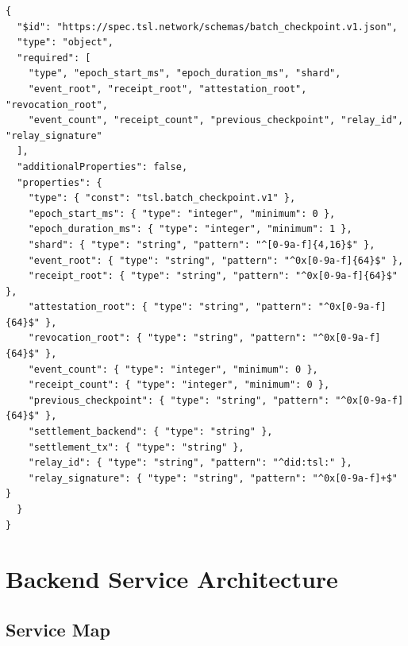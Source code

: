 \documentclass[11pt]{article}
\begin{document}
\begin{lstlisting}[style=tslcode]
{
  "$id": "https://spec.tsl.network/schemas/batch_checkpoint.v1.json",
  "type": "object",
  "required": [
    "type", "epoch_start_ms", "epoch_duration_ms", "shard",
    "event_root", "receipt_root", "attestation_root", "revocation_root",
    "event_count", "receipt_count", "previous_checkpoint", "relay_id", "relay_signature"
  ],
  "additionalProperties": false,
  "properties": {
    "type": { "const": "tsl.batch_checkpoint.v1" },
    "epoch_start_ms": { "type": "integer", "minimum": 0 },
    "epoch_duration_ms": { "type": "integer", "minimum": 1 },
    "shard": { "type": "string", "pattern": "^[0-9a-f]{4,16}$" },
    "event_root": { "type": "string", "pattern": "^0x[0-9a-f]{64}$" },
    "receipt_root": { "type": "string", "pattern": "^0x[0-9a-f]{64}$" },
    "attestation_root": { "type": "string", "pattern": "^0x[0-9a-f]{64}$" },
    "revocation_root": { "type": "string", "pattern": "^0x[0-9a-f]{64}$" },
    "event_count": { "type": "integer", "minimum": 0 },
    "receipt_count": { "type": "integer", "minimum": 0 },
    "previous_checkpoint": { "type": "string", "pattern": "^0x[0-9a-f]{64}$" },
    "settlement_backend": { "type": "string" },
    "settlement_tx": { "type": "string" },
    "relay_id": { "type": "string", "pattern": "^did:tsl:" },
    "relay_signature": { "type": "string", "pattern": "^0x[0-9a-f]+$" }
  }
}
\end{lstlisting}

\section{Backend Service Architecture}

\subsection{Service Map}
\end{document}
